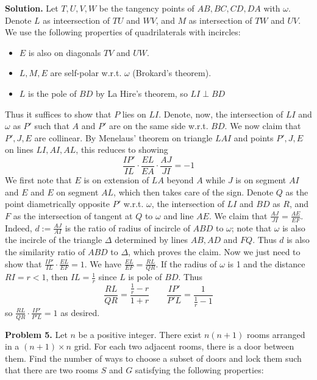 \documentclass[11pt,a4paper]{article}
\begin{document}
	\textbf{Solution.} 
	Let $T, U, V, W$ be the tangency points of $AB, BC, CD, DA$ with $\omega$. 
	Denote $L$ as inteersection of $TU$ and $WV$, and $M$ as intersection of $TW$ and $UV$. 
	We use the following properties of quadrilaterals with incircles: 
	\begin{itemize}
		\item $E$ is also on diagonals $TV$ and $UW$. 
		
		\item $L,M, E$ are self-polar w.r.t. $\omega$ (Brokard's theorem). 
		
		\item $L$ is the pole of $BD$ by La Hire's theorem, so $LI\perp BD$
	\end{itemize}
	Thus it suffices to show that $P$ lies on $LI$. 
	Denote, now, the intersection of $LI$ and $\omega$ as $P'$ such that $A$ and $P'$ are on the same side w.r.t. $BD$. 
	We now claim that $P', J, E$ are collinear.
	By Menelaus' theorem on triangle $LAI$ and points $P', J, E$ on lines $LI, AI, AL$, this reduces to showing 
	\[
	\frac{IP'}{IL}\cdot \frac{EL}{EA}\cdot \frac{AJ}{JI} = -1
	\]
	We first note that $E$ is on extension of $LA$ beyond $A$ while $J$ is on segment $AI$ and $E$ and $E$ on segment $AL$, 
	which then takes care of the sign. 
	Denote $Q$ as the point diametrically opposite $P'$ w.r.t. $\omega$, the intersection of $LI$ and $BD$ as $R$, 
	and $F$ as the intersection of tangent at $Q$ to $\omega$ and line $AE$. 
	We claim that $\frac{AJ}{JI} = \frac{AE}{EF}$. 
	Indeed, $d:=\frac{AJ}{AI}$ is the ratio of radius of incircle of $ABD$ to $\omega$; 
	note that $\omega$ is also the incircle of the triangle $\Delta$ determined by lines $AB, AD$ and $FQ$. 
	Thus $d$ is also the similarity ratio of $ABD$ to $\Delta$, 
	which proves the claim. 
	Now we just need to show that $\frac{IP'}{IL}\cdot \frac{EL}{EF}=1$. 
	We have $\frac{EL}{EF}=\frac{RL}{QR}$. 
	If the radius of $\omega$ is 1 and the distance $RI=r<1$, 
	then $IL=\frac{1}{r}$ since $L$ is pole of $BD$. 
	Thus 
	\[
	\frac{RL}{QR} = \frac{\frac 1r - r}{1+r}\qquad \frac{IP'}{P'L}=\frac{1}{\frac 1r-1}
	\]
	so $\frac{RL}{QR}\cdot \frac{IP'}{P'L}=1$ as desired. 
	
	\textbf{Problem 5.}
	Let $n$ be a positive integer. There exist $n(n+1)$ rooms arranged in a $(n+1)\times n$ grid. For each two adjacent rooms, there is a door between them. Find the number of ways to choose a subset of doors and lock them such that there are two rooms $S$ and $G$ satisfying the following properties:
	
\end{document}
